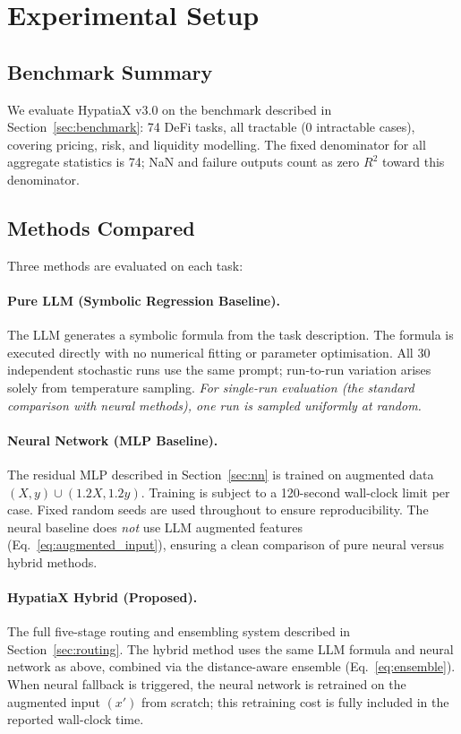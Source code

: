 \documentclass[twoside,11pt]{article}
\newcommand{\Rsq}{R^{2}}
\begin{document}
\section{Experimental Setup}
\label{sec:setup}

\subsection{Benchmark Summary}
\label{sec:setup_summary}

We evaluate HypatiaX v3.0 on the benchmark described in Section~\ref{sec:benchmark}:
74 DeFi tasks, all tractable (0 intractable cases), covering pricing, risk, and
liquidity modelling.  The fixed denominator for all aggregate statistics is 74;
NaN and failure outputs count as zero $\Rsq$ toward this denominator.

\subsection{Methods Compared}
\label{sec:setup_methods}

Three methods are evaluated on each task:

\paragraph{Pure LLM (Symbolic Regression Baseline).}
The LLM generates a symbolic formula from the task description.  The formula is
executed directly with no numerical fitting or parameter optimisation.  All 30
independent stochastic runs use the same prompt; run-to-run variation arises
solely from temperature sampling.  \emph{For single-run evaluation (the standard
comparison with neural methods), one run is sampled uniformly at random.}

\paragraph{Neural Network (MLP Baseline).}
The residual MLP described in Section~\ref{sec:nn} is trained on augmented data
$(X, y) \cup (1.2X, 1.2y)$.  Training is subject to a 120-second wall-clock
limit per case.  Fixed random seeds are used throughout to ensure reproducibility.
The neural baseline does \emph{not} use LLM augmented features (Eq.~\ref{eq:augmented_input}),
ensuring a clean comparison of pure neural versus hybrid methods.

\paragraph{HypatiaX Hybrid (Proposed).}
The full five-stage routing and ensembling system described in Section~\ref{sec:routing}.
The hybrid method uses the same LLM formula and neural network as above, combined via
the distance-aware ensemble (Eq.~\ref{eq:ensemble}).  When neural fallback is triggered,
the neural network is retrained on the augmented input $(x')$ from scratch; this
retraining cost is fully included in the reported wall-clock time.
\end{document}

